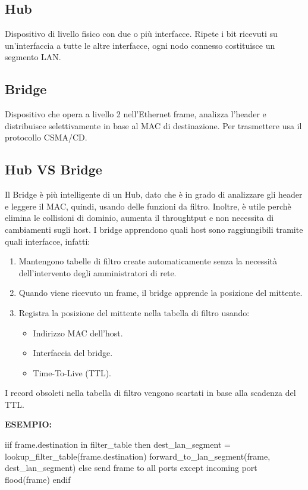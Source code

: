\subsection{Hub}
Dispositivo di livello fisico con due o più interfacce. Ripete i bit ricevuti su un'interfaccia a tutte le altre interfacce, ogni nodo connesso costituisce un segmento LAN.

\subsection{Bridge}
Dispositivo che opera a livello 2 nell'Ethernet frame, analizza l'header e distribuisce selettivamente in base al MAC di destinazione. Per trasmettere usa il protocollo CSMA/CD.

\subsection{Hub VS Bridge}
Il Bridge è più intelligente di un Hub, dato che è in grado di analizzare gli header e leggere il MAC, quindi, usando delle funzioni da filtro.
Inoltre, è utile perchè elimina le collisioni di dominio, aumenta il throughtput e non necessita di cambiamenti sugli host.
I bridge apprendono quali host sono raggiungibili tramite quali interfacce, infatti:
\begin{enumerate}
    \item Mantengono tabelle di filtro create automaticamente senza la necessità dell'intervento degli amministratori di rete.
    \item Quando viene ricevuto un frame, il bridge apprende la posizione del mittente.
    \item Registra la posizione del mittente nella tabella di filtro usando:
    \begin{itemize}
        \item Indirizzo MAC dell'host.
        \item Interfaccia del bridge.
        \item Time-To-Live (TTL).
    \end{itemize}
\end{enumerate}
I record obsoleti nella tabella di filtro vengono scartati in base alla scadenza del TTL.

\vspace*{0.02\textheight}
\textbf{ESEMPIO:}
\begin{bashbox}
iif frame.destination in filter_table then
    dest_lan_segment = lookup_filter_table(frame.destination)
    forward_to_lan_segment(frame, dest_lan_segment)
else
    {send frame to all ports except incoming port}
    flood(frame)
endif
\end{bashbox}

